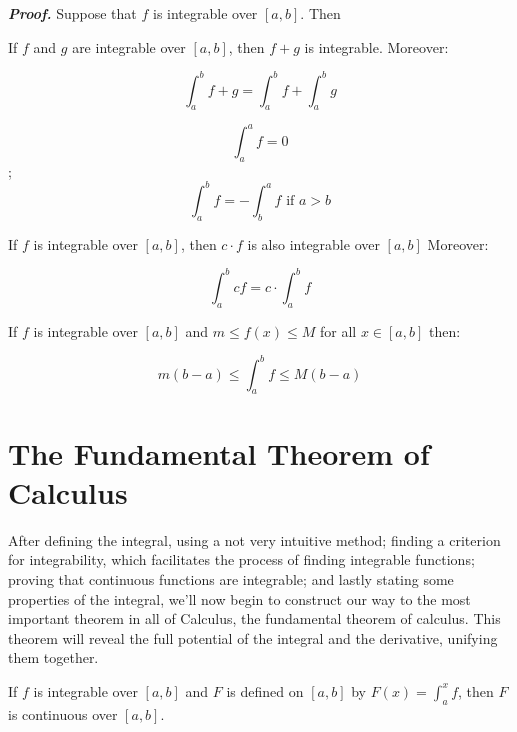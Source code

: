 \documentclass{report}
\begin{document}

    \textit{\textbf{Proof.}} Suppose that $f$ is integrable over $[a,b]$. Then 

    \begin{thBox}
        If $f$ and $g$ are integrable over $[a,b]$, then $f+g$ is integrable. Moreover:

        $$\int_{a}^{b}f+g = \int_{a}^{b}f + \int_{a}^{b}g$$
    \end{thBox}

    \begin{defBox}
        $$\int_{a}^{a}f = 0$$;
        $$\int_{a}^{b}f = - \int_{b}^{a}f \text{ if } a> b$$
    \end{defBox}

    \begin{thBox}
        If $f$ is integrable over $[a,b]$, then $c\cdot f$ is also integrable over $[a,b]$ Moreover:

        $$\int_{a}^{b}cf = c\cdot \int_{a}^{b}f$$
    \end{thBox}

    \begin{thBox}
        If $f$ is integrable over $[a,b]$ and $m\leq f(x) \leq M$ for all $x \in [a,b]$ then:

        $$m(b-a) \leq \int_{a}^{b}f \leq M(b-a)$$
    \end{thBox}


    \section{The Fundamental Theorem of Calculus}

    After defining the integral, using a not very intuitive method; finding a criterion for integrability, which facilitates the process of finding integrable functions; proving that continuous functions are integrable; and lastly stating some properties of the integral, we'll now begin to construct our way to the most important theorem in all of Calculus, the fundamental theorem of calculus. This theorem will reveal the full potential of the integral and the derivative, unifying them together.

    \begin{thBox}
        If $f$ is integrable over $[a,b]$ and $F$ is defined on $[a,b]$ by $F(x) = \int_{a}^{x}f$, then $F$ is continuous over $[a,b]$.
    \end{thBox}
\end{document}
